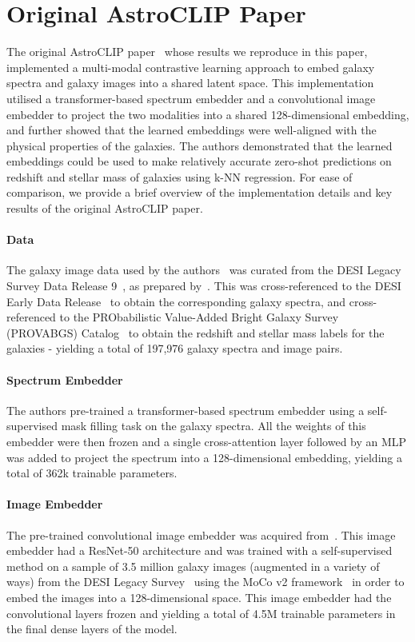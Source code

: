 
\section{Original AstroCLIP Paper}\label{sec:original-paper}
The original AstroCLIP paper~\cite{astroclip} whose results we reproduce in this paper, implemented a multi-modal contrastive
learning approach to embed galaxy spectra and galaxy images into a shared latent space.
This implementation utilised a transformer-based spectrum embedder and a convolutional image embedder to project the two
modalities into a shared 128-dimensional embedding, and further showed that the learned embeddings were well-aligned
with the physical properties of the galaxies.
The authors demonstrated that the learned embeddings could be used to make relatively accurate zero-shot predictions on
redshift and stellar mass of galaxies using k-NN regression.
For ease of comparison, we provide a brief overview of the implementation details and key results of the original
AstroCLIP paper.

\paragraph{Data} The galaxy image data used by the authors~\citep{astroclip} was curated from the DESI Legacy Survey Data
Release 9~\citep{desilegacy2018}, as prepared by~\cite{stein2021}.
This was cross-referenced to the DESI Early Data Release~\citep{desiearly2023} to obtain the corresponding galaxy spectra,
and cross-referenced to the PRObabilistic Value-Added Bright Galaxy Survey (PROVABGS) Catalog~\citep{provabgs2021}
to obtain the redshift and stellar mass labels for the galaxies - yielding a total of 197,976 galaxy spectra and image pairs.

\paragraph{Spectrum Embedder} The authors pre-trained a transformer-based spectrum embedder using a self-supervised mask
filling task on the galaxy spectra.
All the weights of this embedder were then frozen and a single cross-attention layer followed by an MLP was added to project
the spectrum into a 128-dimensional embedding, yielding a total of 362k trainable parameters.

\paragraph{Image Embedder} The pre-trained convolutional image embedder was acquired from~\cite{stein2021}.
This image embedder had a ResNet-50 architecture and was trained with a self-supervised method on a sample of 3.5 million
galaxy images (augmented in a variety of ways) from the DESI Legacy Survey~\citep{desilegacy2018} using the MoCo v2
framework~\citep{moco2020, mocov22020} in order to embed the images into a 128-dimensional space.
This image embedder had the convolutional layers frozen and yielding a total of 4.5M trainable parameters in the final
dense layers of the model.


